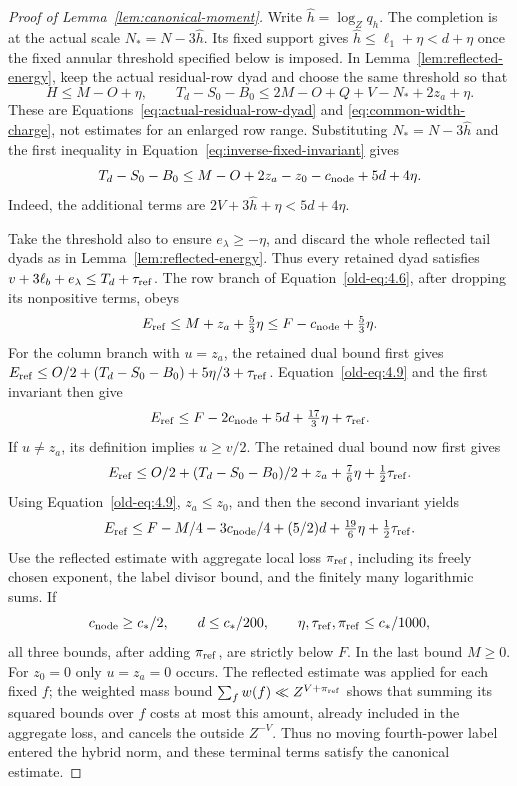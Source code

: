 \documentclass[11pt,a4paper]{article}
\numberwithin{equation}{section}
\numberwithin{figure}{section}
\theoremstyle{definition}
\theoremstyle{remark}
\begin{document}
\begin{proof}[Proof of Lemma~\ref{lem:canonical-moment}]
Write \(\widehat h=\log_Zq_h\).  The completion is at the actual scale
\(N_*=N-3\widehat h\).  Its fixed support gives
\(\widehat h\le\ell_1+\eta<d+\eta\) once the fixed annular threshold
specified below is imposed.  In Lemma~\ref{lem:reflected-energy}, keep
the actual residual-row dyad and choose the same threshold so that
\begin{equation}\label{eq:inverse-terminal-width}
 H\le M-O+\eta,\qquad
 T_d-S_0-B_0\le2M-O+Q+V-N_*+2z_a+\eta.
\end{equation}
These are Equations~\eqref{eq:actual-residual-row-dyad} and
\eqref{eq:common-width-charge}, not estimates for an enlarged row
range.  Substituting \(N_*=N-3\widehat h\) and the first inequality in
Equation~\eqref{eq:inverse-fixed-invariant} gives
\begin{equation}\label{old-eq:4.9}
 T_d-S_0-B_0
 \le M-O+2z_a-z_0-c_{\rm node}+5d+4\eta.
\end{equation}
Indeed, the additional terms are \(2V+3\widehat h+\eta<5d+4\eta\).

Take the threshold also to ensure \(e_\lambda\ge-\eta\), and discard
the whole reflected tail dyads as in Lemma~\ref{lem:reflected-energy}.
Thus every retained dyad satisfies
\(v+3\ell_b+e_\lambda\le T_d+\tau_{\rm ref}\).  The row branch of
Equation~\eqref{old-eq:4.6}, after dropping its nonpositive terms, obeys
\[
 E_{\rm ref}\le M+z_a+\tfrac53\eta
       \le F-c_{\rm node}+\tfrac53\eta.
\]
For the column branch with \(u=z_a\), the retained dual bound first gives
\(E_{\rm ref}\le O/2+(T_d-S_0-B_0)+5\eta/3+\tau_{\rm ref}\).
Equation~\eqref{old-eq:4.9} and the first invariant then give
\begin{equation}\label{old-eq:4.10}
 E_{\rm ref}\le F-2c_{\rm node}+5d+\tfrac{17}{3}\eta+\tau_{\rm ref}.
\end{equation}
If \(u\ne z_a\), its definition implies \(u\ge v/2\).  The retained
dual bound now first gives
\[
 E_{\rm ref}\le O/2+(T_d-S_0-B_0)/2+z_a
                    +\tfrac76\eta+\tfrac12\tau_{\rm ref}.
\]
Using Equation~\eqref{old-eq:4.9}, \(z_a\le z_0\), and then the second
invariant yields
\begin{equation}\label{old-eq:4.11}
 E_{\rm ref}\le F-M/4-3c_{\rm node}/4+(5/2)d
                    +\tfrac{19}{6}\eta+\tfrac12\tau_{\rm ref}.
\end{equation}
Use the reflected estimate with aggregate local loss
\(\pi_{\rm ref}\), including its freely chosen exponent, the label divisor
bound, and the finitely many logarithmic sums.  If
\[
 c_{\rm node}\ge c_*/2,\qquad
 d\le c_*/200,\qquad \eta,\tau_{\rm ref},\pi_{\rm ref}\le c_*/1000,
\]
all three bounds, after adding \(\pi_{\rm ref}\), are strictly below
\(F\).  In the last bound \(M\ge0\).  For \(z_0=0\) only \(u=z_a=0\) occurs.
The reflected estimate was applied for each fixed \(f\); the weighted
mass bound \(\sum_f w(f)\ll Z^{V+\pi_{\rm ref}}\) shows that summing its
squared bounds over \(f\) costs at most this amount, already included
in the aggregate loss, and cancels the outside \(Z^{-V}\).
Thus no moving fourth-power label entered the hybrid norm, and these
terminal terms satisfy the canonical estimate.


\end{proof}
\end{document}
